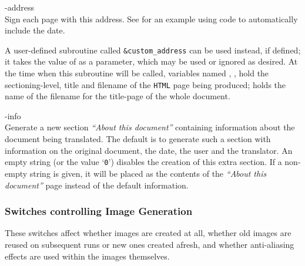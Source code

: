 \begin{htmllist}
%
%

\item [ -address \Meta{author-address}\label{cs_address}]
\\
Sign each page with this address.\html{\\}
See  for an example using \Perl{} code
to automatically include the date.

A user-defined \Perl{} subroutine called \texttt{\&custom\_address} 
can be used instead, if defined; it takes the value of  
as a parameter, which may be used or ignored as desired.
At the time when this subroutine will be called, 
variables named , , 
hold the sectioning-level, title and filename of the \texttt{HTML} page
being produced;  holds the name of the filename for the title-page
of the whole document.


\item [ -info \Meta{string}\label{cs_infostring}]
\\
Generate a new section \emph{``About this document'' } containing information
about the document being translated. The default is to generate such a section 
with information on the original document, the date, the user and the translator.
An empty string (or the value `\texttt{0}') 
disables the creation of this extra section.\html{\\}
If a non-empty string is given, it will be placed as the contents of the 
\emph{``About this document'' } page instead of the default information.
%
\end{htmllist}


\subsubsection{Switches controlling Image Generation}
%
These switches affect whether images are created at all, whether
old images are reused on subsequent runs or new ones created afresh,
and whether anti-aliasing effects are used within the images themselves.

